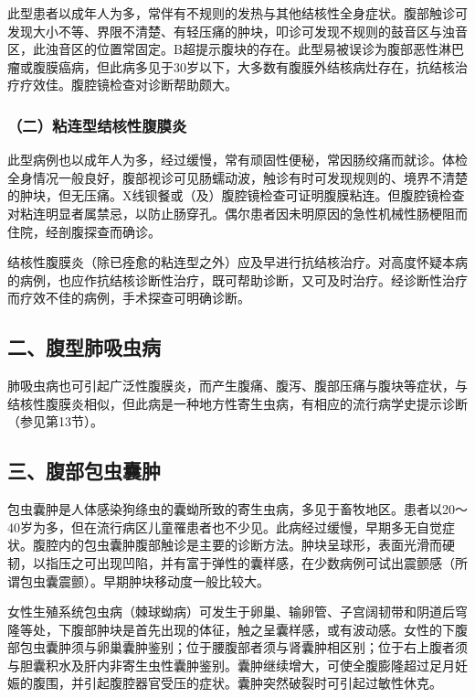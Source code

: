 此型患者以成年人为多，常伴有不规则的发热与其他结核性全身症状。腹部触诊可发现大小不等、界限不清楚、有轻压痛的肿块，叩诊可发现不规则的鼓音区与浊音区，此浊音区的位置常固定。B超提示腹块的存在。此型易被误诊为腹部恶性淋巴瘤或腹膜癌病，但此病多见于30岁以下，大多数有腹膜外结核病灶存在，抗结核治疗疗效佳。腹腔镜检查对诊断帮助颇大。

\subsubsection{（二）粘连型结核性腹膜炎}

此型病例也以成年人为多，经过缓慢，常有顽固性便秘，常因肠绞痛而就诊。体检全身情况一般良好，腹部视诊可见肠蠕动波，触诊有时可发现规则的、境界不清楚的肿块，但无压痛。X线钡餐或（及）腹腔镜检查可证明腹膜粘连。但腹腔镜检查对粘连明显者属禁忌，以防止肠穿孔。偶尔患者因未明原因的急性机械性肠梗阻而住院，经剖腹探查而确诊。

结核性腹膜炎（除已痊愈的粘连型之外）应及早进行抗结核治疗。对高度怀疑本病的病例，也应作抗结核诊断性治疗，既可帮助诊断，又可及时治疗。经诊断性治疗而疗效不佳的病例，手术探查可明确诊断。

\subsection{二、腹型肺吸虫病}

肺吸虫病也可引起广泛性腹膜炎，而产生腹痛、腹泻、腹部压痛与腹块等症状，与结核性腹膜炎相似，但此病是一种地方性寄生虫病，有相应的流行病学史提示诊断（参见第13节）。

\subsection{三、腹部包虫囊肿}

包虫囊肿是人体感染狗绦虫的囊蚴所致的寄生虫病，多见于畜牧地区。患者以20～40岁为多，但在流行病区儿童罹患者也不少见。此病经过缓慢，早期多无自觉症状。腹腔内的包虫囊肿腹部触诊是主要的诊断方法。肿块呈球形，表面光滑而硬韧，以指压之可出现凹陷，并有富于弹性的囊样感，在少数病例可试出震颤感（所谓包虫囊震颤）。早期肿块移动度一般比较大。

女性生殖系统包虫病（棘球蚴病）可发生于卵巢、输卵管、子宫阔韧带和阴道后穹隆等处，下腹部肿块是首先出现的体征，触之呈囊样感，或有波动感。女性的下腹部包虫囊肿须与卵巢囊肿鉴别；位于腰腹部者须与肾囊肿相区别；位于右上腹者须与胆囊积水及肝内非寄生虫性囊肿鉴别。囊肿继续增大，可使全腹膨隆超过足月妊娠的腹围，并引起腹腔器官受压的症状。囊肿突然破裂时可引起过敏性休克。

